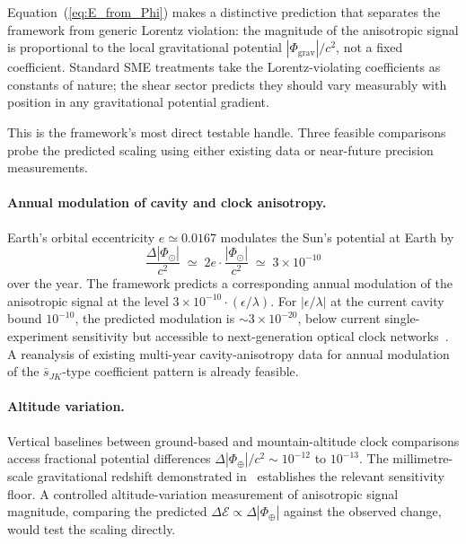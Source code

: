 \documentclass[pdflatex,sn-mathphys-num]{sn-jnl}%
\theoremstyle{thmstyleone}%
\theoremstyle{thmstyletwo}%
\theoremstyle{thmstylethree}%
\begin{document}
Equation~(\ref{eq:E_from_Phi}) makes a distinctive prediction
that separates the framework from generic Lorentz violation:
the magnitude of the anisotropic signal is proportional to the
local gravitational potential $|\Phi_{\mathrm{grav}}|/c^2$,
not a fixed coefficient. Standard SME treatments take the
Lorentz-violating coefficients as constants of nature; the
shear sector predicts they should vary measurably with
position in any gravitational potential gradient.

This is the framework's most direct testable handle. Three
feasible comparisons probe the predicted scaling using either
existing data or near-future precision measurements.

\paragraph{Annual modulation of cavity and clock anisotropy.}
Earth's orbital eccentricity $e\simeq 0.0167$ modulates the
Sun's potential at Earth by
\begin{equation}
    \frac{\Delta|\Phi_{\odot}|}{c^2}
    \;\simeq\;
    2e\cdot\frac{|\Phi_{\odot}|}{c^2}
    \;\simeq\;
    3\times 10^{-10}
\end{equation}
over the year. The framework predicts a corresponding annual
modulation of the anisotropic signal at the level
$3\times 10^{-10}\cdot(\epsilon/\lambda)$. For
$|\epsilon/\lambda|$ at the current cavity bound $10^{-10}$,
the predicted modulation is $\sim 3\times 10^{-20}$, below
current single-experiment sensitivity but accessible to
next-generation optical clock networks~\cite{Bothwell2022,
Sanner2019}. A reanalysis of existing multi-year
cavity-anisotropy data for annual modulation of the
$\bar{s}_{JK}$-type coefficient pattern is already feasible.

\paragraph{Altitude variation.}
Vertical baselines between ground-based and mountain-altitude
clock comparisons access fractional potential differences
$\Delta|\Phi_{\oplus}|/c^2\sim 10^{-12}$ to $10^{-13}$. The
millimetre-scale gravitational redshift demonstrated
in~\cite{Bothwell2022} establishes the relevant sensitivity
floor. A controlled altitude-variation measurement of
anisotropic signal magnitude, comparing the predicted
$\Delta\mathcal{E}\propto\Delta|\Phi_{\oplus}|$ against the
observed change, would test the scaling directly.
\end{document}
